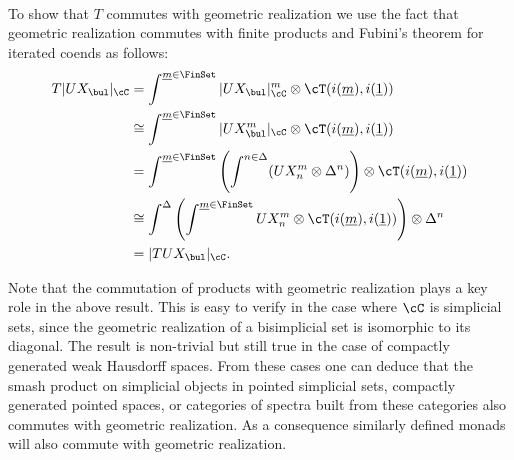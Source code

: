 \documentclass[leqno,oneside,english]{elsarticle}
\newcounter{enumisaved}
\newlength{\thmsaved}
\newlength{\thmnow}
\begin{document}
{{    {}  \ifshowcomplete
  \ 
  {
{{\ifshowsaveblocks
{}
\fi}}{}
To show that $T$ commutes with geometric
realization we use the fact that
geometric realization commutes with finite products and Fubini's theorem
for iterated coends as follows:
\begin{align*}
  T|UX_{\bul}|_{\cC} 
  &= \int^{\underline{m}\in \FinSet} |UX_{\bul}|_{\cC}^{m} 
  \otimes \cT(i(\underline{m}),i(\underline{1}))\\
  &\cong\int^{\underline{m}\in \FinSet}
  |UX_{\bul}^{m}|_{\cC}
  \otimes \cT(i(\underline{m}),i(\underline{1}))\\
  &= \int^{\underline{m}\in \FinSet} \left(\int^{n\in \Delta}
  (UX_n^{m}\otimes \Delta^n)\right)\otimes 
  \cT(i(\underline{m}),i(\underline{1}))\\ 
  &\cong \int^{\Delta} \left( \int^{\underline{m}\in
    \FinSet} UX_n^{m}\otimes \cT(i(\underline{m}),i(\underline{1}))\right)
  \otimes \Delta^n\\
  &= |TUX_{\bul}|_{\cC}.
\end{align*}

Note that the commutation of products with geometric realization
plays a key role in the above result. This is easy to verify in the
case where $\cC$ is simplicial sets, since the geometric realization
of a bisimplicial set is isomorphic to its diagonal. The result is
non-trivial but still true in the case of compactly generated weak
Hausdorff spaces. From these cases one can deduce that the smash
product on simplicial objects in pointed simplicial sets, compactly
generated pointed spaces, or categories of spectra built from these
categories also commutes with geometric realization. As a
consequence similarly defined monads will also commute with
geometric realization.

}
  {}
  \ 
  \ifthenelse{\lengthtest{\thmnow > \thmsaved}}{
    
    \setcounter{thm}{{\strip@pt{\thmsaved}}}  
  }{
    
  }
  \setcounter{enumi}{\theenumisaved}
    \else  \fi
}}{}
\end{document}
